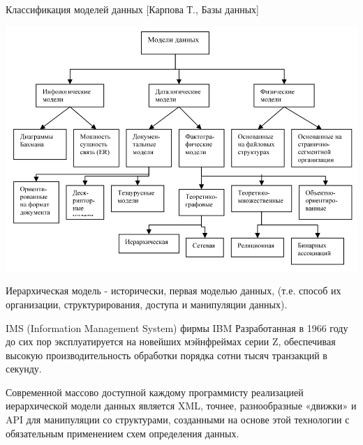 \documentclass{beamer}
\begin{document}
\begin{frame}
\begin{block}{Классификация моделей данных [Карпова Т., Базы данных]}
\begin{center}
\includegraphics[scale=0.35]{images/shema-03.png}
\end{center}
\end{block}
\end{frame}

\begin{frame}
\begin{block}{Иерархическая модель}
- исторически, первая моделью данных, (т.е. способ их организации, структурирования, доступа и манипуляции данных).
\end{block}
IMS (Information Management System) фирмы IBM Разработанная в 1966 году до сих пор эксплуатируется на новейших мэйнфреймах серии Z, обеспечивая высокую производительность обработки порядка сотни тысяч транзакций в секунду.

Современной массово доступной каждому программисту реализацией иерархической модели данных является XML, точнее, разнообразные «движки» и API для манипуляции со структурами, созданными на основе этой технологии с обязательным применением схем определения данных.
\end{frame}
\end{document}
